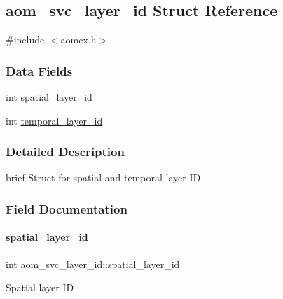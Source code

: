 \hypertarget{structaom__svc__layer__id}{}\subsection{aom\+\_\+svc\+\_\+layer\+\_\+id Struct Reference}
\label{structaom__svc__layer__id}


{\ttfamily \#include $<$aomcx.\+h$>$}

\subsubsection*{Data Fields}
\begin{DoxyCompactItemize}
\item 
int \hyperlink{structaom__svc__layer__id_af018f2e9cc472827a75b92a78ba6ee4e}{spatial\+\_\+layer\+\_\+id}
\item 
int \hyperlink{structaom__svc__layer__id_a9a28c1b126e8d1fdda6e1d881afb66fb}{temporal\+\_\+layer\+\_\+id}
\end{DoxyCompactItemize}


\subsubsection{Detailed Description}
brief Struct for spatial and temporal layer ID 

\subsubsection{Field Documentation}
\mbox{\label{structaom__svc__layer__id_af018f2e9cc472827a75b92a78ba6ee4e}} 
\paragraph{\texorpdfstring{spatial\+\_\+layer\+\_\+id}{spatial\_layer\_id}}
{\footnotesize\ttfamily int aom\+\_\+svc\+\_\+layer\+\_\+id\+::spatial\+\_\+layer\+\_\+id}

Spatial layer ID \mbox{\label{structaom__svc__layer__id_a9a28c1b126e8d1fdda6e1d881afb66fb}} 
